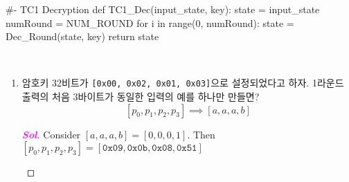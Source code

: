 \begin{enumerate}[\bf 1.]
\begin{python}[]
#- TC1 Decryption
def TC1_Dec(input_state, key):
	state = input_state
	numRound = NUM_ROUND
	for i in range(0, numRound):
		state = Dec_Round(state, key)
	return state
\end{python}\\
\newpage
\begin{enumerate}
	\item 암호키 32비트가 \texttt{[0x00, 0x02, 0x01, 0x03]}으로 설정되었다고 하자.
	1라운드 출력의 처음 3바이트가 동일한 입력의 예를 하나만 만들면? \[
	\left[p_0, p_1, p_2, p_3\right]\implies\left[a,a,a,b\right]
	\]
	\begin{proof}[\textcolor{magenta}{\bf Sol}]
		Consider $[a,a,a,b]=[0,0,0,1]$. Then $[p_0, p_1, p_2, p_3]=[\texttt{0x09},\texttt{0x0b},\texttt{0x08},\texttt{0x51}]$
		\begin{center}
\end{center}
\end{proof}
\end{enumerate}
\end{enumerate}
